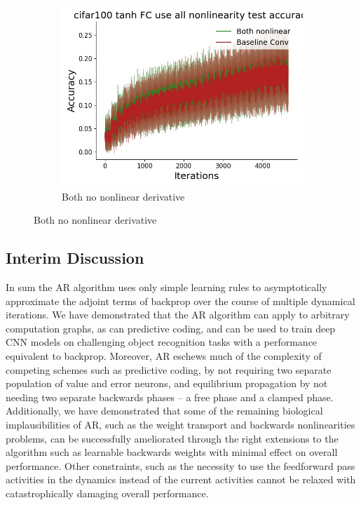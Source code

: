 \begin{figure}[htb]
\begin{subfigure}{0.25\textwidth}
  \includegraphics[width=\linewidth]{chapter_6_figures/AR/cifar100_tanh_FC_use_all_nonlinearity_test_accuracies_prelim_1.jpg}
  \caption{Both no nonlinear derivative}
\end{subfigure}
\end{figure}


\subsection{Interim Discussion}

In sum the AR algorithm uses only simple learning rules to asymptotically approximate the adjoint terms of backprop over the course of multiple dynamical iterations. We have demonstrated that the AR algorithm can apply to arbitrary computation graphs, as can predictive coding, and can be used to train deep CNN models on challenging object recognition tasks with a performance equivalent to backprop. Moreover, AR eschews much of the complexity of competing schemes such as predictive coding, by not requiring two separate population of value and error neurons, and equilibrium propagation by not needing two separate backwards phases -- a free phase and a clamped phase. Additionally, we have demonstrated that some of the remaining biological implausibilities of AR, such as the weight transport and backwards nonlinearities problems, can be successfully ameliorated through the right extensions to the algorithm such as learnable backwards weights with minimal effect on overall performance. Other constraints, such as the necessity to use the feedforward pass activities in the dynamics instead of the current activities cannot be relaxed with catastrophically damaging overall performance.

